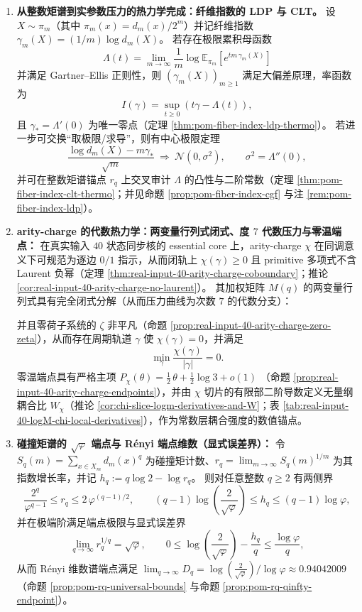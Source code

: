 \begin{theorem}
\begin{enumerate}
  \item \textbf{从整数矩谱到实参数压力的热力学完成：纤维指数的 LDP 与 CLT。}
  设 \(X\sim\pi_m\)（其中 \(\pi_m(x)=d_m(x)/2^m\)）并记纤维指数 \(\gamma_m(X)=(1/m)\log d_m(X)\)。
  若存在极限累积母函数
  \[
  \Lambda(t)=\lim_{m\to\infty}\frac{1}{m}\log \mathbb{E}_{\pi_m}\!\left[e^{t m\,\gamma_m(X)}\right]
  \]
  并满足 Gartner--Ellis 正则性，则 \((\gamma_m(X))_{m\ge 1}\) 满足大偏差原理，率函数为
  \[
  I(\gamma)=\sup_{t\ge 0}(t\gamma-\Lambda(t)),
  \]
  且 \(\gamma_\ast=\Lambda'(0)\) 为唯一零点（定理 \ref{thm:pom-fiber-index-ldp-thermo}）。
  若进一步可交换“取极限/求导”，则有中心极限定理
  \[
  \frac{\log d_m(X)-m\gamma_\ast}{\sqrt m}\ \Longrightarrow\ \mathcal N(0,\sigma^2),
  \qquad \sigma^2=\Lambda''(0),
  \]
  并可在整数矩谱锚点 \(r_q\) 上交叉审计 \(\Lambda\) 的凸性与二阶常数（定理 \ref{thm:pom-fiber-index-clt-thermo}；并见命题 \ref{prop:pom-fiber-index-cgf} 与注 \ref{rem:pom-fiber-index-ldp}）。

  \item \textbf{arity-charge 的代数热力学：两变量行列式闭式、度 \(7\) 代数压力与零温端点：}
  在真实输入 \(40\) 状态同步核的 essential core 上，arity-charge \(\chi\) 在同调意义下可规范为逐边 \(0/1\) 指示，从而闭轨上 \(\chi(\gamma)\ge 0\) 且 primitive 多项式不含 Laurent 负幂（定理 \ref{thm:real-input-40-arity-charge-coboundary}；推论 \ref{cor:real-input-40-arity-charge-no-laurent}）。
  其加权矩阵 \(M(q)\) 的两变量行列式具有完全闭式分解（从而压力曲线为次数 \(7\) 的代数分支）：
  
  并且零荷子系统的 \(\zeta\) 非平凡（命题 \ref{prop:real-input-40-arity-charge-zero-zeta}），从而存在周期轨道 \(\gamma\) 使 \(\chi(\gamma)=0\)，并满足
  \[
  \min_{\gamma}\frac{\chi(\gamma)}{|\gamma|}=0.
  \]
  零温端点具有严格主项
  \(
  P_\chi(\theta)=\tfrac12\,\theta+\tfrac12\log 3+o(1)
  \)
  （命题 \ref{prop:real-input-40-arity-charge-endpoints}），并由 \(\chi\) 切片的有限部二阶导数定义无量纲耦合比
  \(W_\chi\)（推论 \ref{cor:chi-slice-logm-derivatives-and-W}；表 \ref{tab:real-input-40-logM-chi-local-derivatives}），作为常数层耦合强度的数值锚点。

  \item \textbf{碰撞矩谱的 \texorpdfstring{$\sqrt{\varphi}$}{sqrt(phi)} 端点与 Rényi 端点维数（显式误差界）：}
  令 \(S_q(m)=\sum_{x\in X_m}d_m(x)^q\) 为碰撞矩计数、\(r_q=\lim_{m\to\infty}S_q(m)^{1/m}\) 为其指数增长率，并记 \(h_q:=q\log 2-\log r_q\)。
  则对任意整数 \(q\ge 2\) 有两侧界
  \[
  \frac{2^q}{\varphi^{q-1}}\le r_q\le 2\,\varphi^{(q-1)/2},
  \qquad
  (q-1)\log\!\left(\frac{2}{\sqrt{\varphi}}\right)\le h_q\le (q-1)\log\varphi,
  \]
  并在极端阶满足端点极限与显式误差界
  \[
  \lim_{q\to\infty} r_q^{1/q}=\sqrt{\varphi},\qquad
  0\le \log\!\left(\frac{2}{\sqrt{\varphi}}\right)-\frac{h_q}{q}\le \frac{\log\varphi}{q},
  \]
  从而 Rényi 维数谱端点满足
  \(
  \lim_{q\to\infty}D_q=\log\!\left(\frac{2}{\sqrt{\varphi}}\right)/\log\varphi\approx 0.94042009
  \)
  （命题 \ref{prop:pom-rq-universal-bounds} 与命题 \ref{prop:pom-rq-qinfty-endpoint}）。


\end{enumerate}
\end{theorem}
